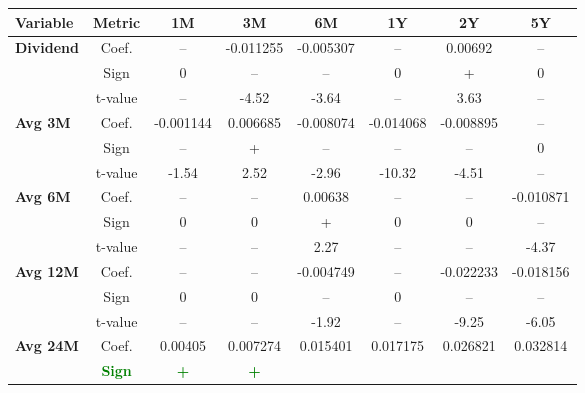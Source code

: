 \documentclass[11pt,english,a4paper,hidelinks]{book}
\begin{document}
\begin{table}[H]
    \centering
    \begin{tabular}{lccccccc}
        \toprule
        \textbf{Variable} & \textbf{Metric} & \textbf{1M} & \textbf{3M} & \textbf{6M} & \textbf{1Y} & \textbf{2Y} & \textbf{5Y} \\
        \midrule
        \multirow{3}{*}{\textbf{Dividend}}
            & Coef.   & --        & -0.011255 & -0.005307 & --        & 0.00692   & --        \\
            & Sign    & 0         & –         & –         & 0         & +         & 0         \\
            & t-value & --        & -4.52     & -3.64     & --        & 3.63      & --        \\
        \cmidrule{1-8}
        \multirow{3}{*}{\textbf{Avg 3M}}
            & Coef.   & -0.001144 & 0.006685  & -0.008074 & -0.014068 & -0.008895 & --        \\
            & Sign    & –         & +         & –         & –         & –         & 0         \\
            & t-value & -1.54     & 2.52      & -2.96     & -10.32    & -4.51     & --        \\
        \cmidrule{1-8}
        \multirow{3}{*}{\textbf{Avg 6M}}
            & Coef.   & --        & --        & 0.00638   & --        & --        & -0.010871 \\
            & Sign    & 0         & 0         & +         & 0         & 0         & –         \\
            & t-value & --        & --        & 2.27      & --        & --        & -4.37     \\
        \cmidrule{1-8}
        \multirow{3}{*}{\textbf{Avg 12M}}
            & Coef.   & --        & --        & -0.004749 & --        & -0.022233 & -0.018156 \\
            & Sign    & 0         & 0         & –         & 0         & –         & –         \\
            & t-value & --        & --        & -1.92     & --        & -9.25     & -6.05     \\
        \cmidrule{1-8}
        \multirow{3}{*}{\textbf{Avg 24M}}
            & Coef.   & 0.00405   & 0.007274  & 0.015401  & 0.017175  & 0.026821  & 0.032814  \\
            & \textbf{\textcolor{green}{Sign}}
                     & \textbf{\textcolor{green}{+}}
                     & \textbf{\textcolor{green}{+}}

\end{tabular}
\end{table}
\end{document}
